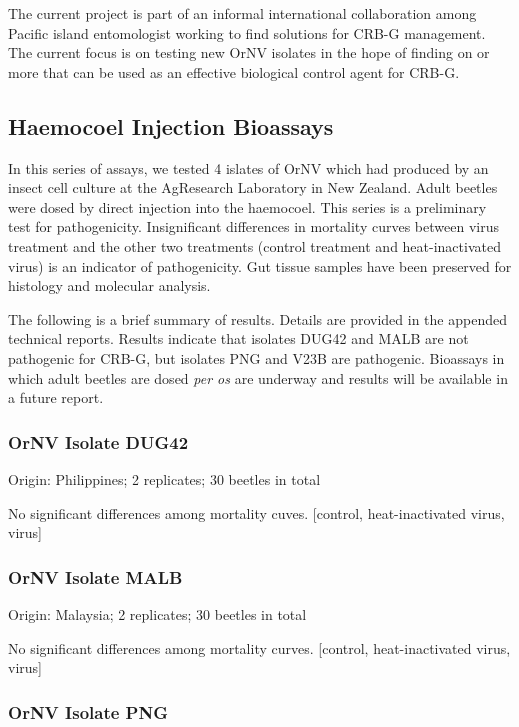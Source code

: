\documentclass[12pt,letterpaper,english]{scrartcl}
\begin{document}
The current project is part of an informal international collaboration
among Pacific island entomologist working to find solutions for CRB-G
management. The current focus is on testing new OrNV isolates in the
hope of finding on or more that can be used as an effective biological
control agent for CRB-G.

\subsection{Haemocoel Injection Bioassays}

In this series of assays, we tested 4 islates of OrNV which had produced
by an insect cell culture at the AgResearch Laboratory in New Zealand.
Adult beetles were dosed by direct injection into the haemocoel. This
series is a preliminary test for pathogenicity. Insignificant differences
in mortality curves between virus treatment and the other two treatments
(control treatment and heat-inactivated virus) is an indicator of
pathogenicity. Gut tissue samples have been preserved for histology
and molecular analysis. 

The following is a brief summary of results. Details are provided
in the appended technical reports. Results indicate that isolates
DUG42 and MALB are not pathogenic for CRB-G, but isolates PNG and
V23B are pathogenic. Bioassays in which adult beetles are dosed \emph{per
os} are underway and results will be available in a future report.

\subsubsection{OrNV Isolate DUG42}

Origin: Philippines; 2 replicates; 30 beetles in total

No significant differences among mortality cuves. {[}control, heat-inactivated
virus, virus{]}

\subsubsection{OrNV Isolate MALB}

Origin: Malaysia; 2 replicates; 30 beetles in total

No significant differences among mortality curves. {[}control, heat-inactivated
virus, virus{]}

\subsubsection{OrNV Isolate PNG}
\end{document}

